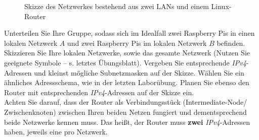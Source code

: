 \documentclass[paper=a4,fontsize=11pt]{scrartcl}%
\numberwithin{equation}{section}
\begin{document}
\begin{enumerate}
\begin{figure}[H]
	\caption{Skizze des Netzwerkes bestehend aus zwei LANs und einem Linux-Router}
	\label{sketch_lan}
	\end{figure}
	\begin{tasks}
		\task Unterteilen Sie Ihre Gruppe, sodass sich im Idealfall zwei Raspberry Pis in einen lokalen Netzwerk $A$ und zwei Raspberry Pis im lokalen Netzwerk $B$ befinden.
		\task Skizzieren Sie Ihre lokalen Netzwerke, sowie das gesamte Netzwerk (Nutzen Sie geeignete Symbole -- s. letztes Übungsblatt).
		\task Vergeben Sie entsprechende \emph{IPv4}-Adressen und kleinst mögliche Subnetzmasken auf der Skizze. Wählen Sie ein ähnliches Adressschema, wie in der letzten Laborübung.
		\task Planen Sie ebenso den Router mit entsprechenden \emph{IPv4}-Adressen auf der Skizze ein.\\
		Achten Sie darauf, dass der Router als Verbindungsstück (Intermediate-Node/ Zwischenknoten) zwischen Ihren beiden Netzen fungiert und dementsprechend beide Netzwerke kennen muss. Das heißt, der Router muss \textbf{zwei} \emph{IPv4}-Adressen haben, jeweils eine pro Netzwerk.
	\end{tasks}
\end{enumerate}
\end{document}
